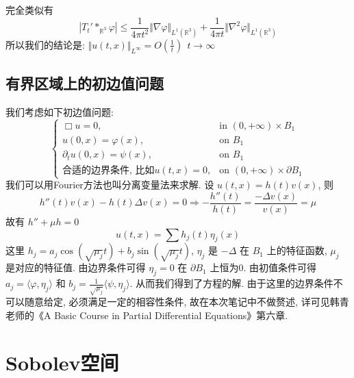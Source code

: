 \documentclass[11pt]{ctexart}[UTF8]
\begin{document}
完全类似有
\begin{equation*}
    |T_{t}' \ast_{\mathbb{R}^{3}} \varphi| \leq \frac{1}{4\pi t^2}\Vert \nabla\varphi \Vert_{L^{1}(\mathbb{R}^{3})}+\frac{1}{4\pi t}\Vert \nabla^2\varphi \Vert_{L^{1}(\mathbb{R}^{3})}
\end{equation*}
所以我们的结论是: $\Vert u(t,x)\Vert_{L^\infty} = O(\frac{1}{t})\ \ t \longrightarrow \infty$

\subsection{有界区域上的初边值问题}
我们考虑如下初边值问题:
\begin{equation*}
    \begin{cases}
        \Box u = 0, & \text{in } (0,+\infty)\times B_{1}\\
        u(0,x) = \varphi(x), & \text{on }  B_{1}\\
        \partial_{t} u(0,x) = \psi(x), & \text{on }  B_{1}\\
        \text{合适的边界条件, 比如}u(t,x) = 0, & \text{on } (0,+\infty)\times \partial B_{1}
    \end{cases}
\end{equation*}
我们可以用Fourier方法也叫分离变量法来求解. 设 $u(t,x) = h(t)v(x)$, 则
\begin{equation*}
    h''(t)v(x) - h(t)\Delta v(x) = 0 \Longrightarrow -\frac{h''(t)}{h(t)} = \frac{-\Delta v(x)}{v(x)} = \mu
\end{equation*}
故有 $h''+\mu h = 0$
\begin{equation*}
    u(t,x) = \sum h_{j}(t)\eta_{j}(x)
\end{equation*}
这里 $h_{j} = a_{j}\cos(\sqrt{\mu_{j}}t)+b_{j}\sin(\sqrt{\mu_{j}}t)$, $\eta_{j}$ 是 $-\Delta$ 在 $B_{1}$ 上的特征函数, $\mu_{j}$ 是对应的特征值. 由边界条件可得 $\eta_{j} = 0$ 在 $\partial B_{1}$ 上恒为0. 由初值条件可得 $a_{j} = \langle \varphi, \eta_{j} \rangle$ 和 $b_{j} = \frac{1}{\sqrt{\mu_{j}}}\langle \psi, \eta_{j} \rangle$. 从而我们得到了方程的解.
由于这里的边界条件不可以随意给定, 必须满足一定的相容性条件, 故在本次笔记中不做赘述, 详可见韩青老师的《A Basic Course in Partial Differential Equations》第六章.\newpage

\section{Sobolev空间}
\end{document}
